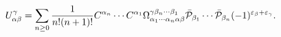 \begin{equation}
U_{\alpha\beta}^{\gamma}=\sum_{n\ge0}\frac{1}{n!(n+1)!}C^{\alpha_{n}}\cdots
C^{\alpha_{1}}\Omega_{\alpha_{1}\cdots\alpha_{n}\alpha\beta}^{\gamma\beta
_{n}\cdots\beta_{1}}\bar{{\cal P}}_{\beta_{1}}\cdots\bar{{\cal P}%
}_{\beta_{n}}(-1)^{\varepsilon_{\beta}+\varepsilon_{\gamma}}.\label{2.11}%
\end{equation}

